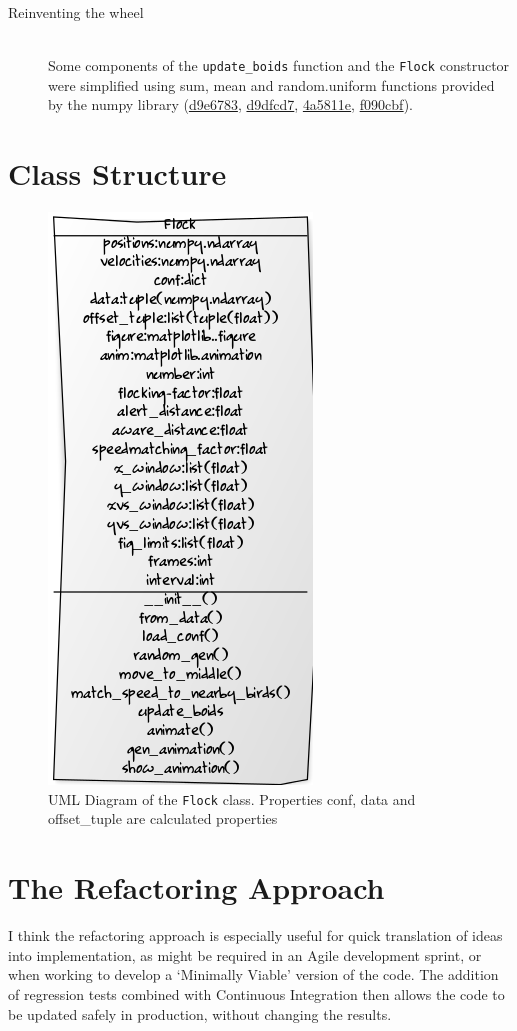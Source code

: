 \documentclass[12pt,a4paper]{article}
\begin{document}
\begin{description}
    \item[Reinventing the wheel] \hfill \\
    Some components of the \texttt{update\_boids} function and the \texttt{Flock} constructor were simplified using sum, mean and random.uniform functions provided by the numpy library (\href{https://github.com/padraic-padraic/bad-boids/commit/d9e6783944c37458441bec59bca9e4b98d243345}{d9e6783}, \href{https://github.com/padraic-padraic/bad-boids/commit/d9dfcd71929bb125dd9353619b0fc9912ddc7ac6}{d9dfcd7}, \href{https://github.com/padraic-padraic/bad-boids/commit/4a5811e5a2377f76cacd545c37c7808f1908a94b}{4a5811e}, \href{https://github.com/padraic-padraic/bad-boids/commit/f090cbf5c5810bdb0068396e760e3cdbbe13a71a}{f090cbf}).


\end{description}
\section*{Class Structure}

\begin{figure}[h]
    \centering
    \includegraphics[width=.4\textwidth]{yUML.png}
    \caption{UML Diagram of the \texttt{Flock} class. Properties conf, data and offset\_tuple are calculated properties}
\end{figure}

\section*{The Refactoring Approach}
I think the refactoring approach is especially useful for quick translation of ideas into implementation, as might be required in an Agile development sprint, or when working to develop a `Minimally Viable' version of the code. The addition of regression tests combined with Continuous Integration then allows the code to be updated safely in production, without changing the results.
\end{document}
